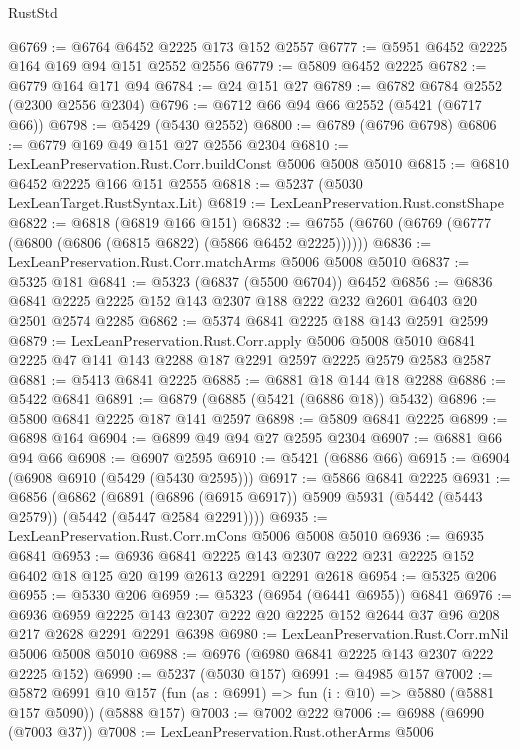\begin{lexlean}{RustStd}
\begin{coremodule}
@6769 := @6764 @6452 @2225 @173 @152 @2557
@6777 := @5951 @6452 @2225 @164 @169 @94 @151 @2552 @2556
@6779 := @5809 @6452 @2225
@6782 := @6779 @164 @171 @94
@6784 := @24 @151 @27
@6789 := @6782 @6784 @2552 (@2300 @2556 @2304)
@6796 := @6712 @66 @94 @66 @2552 (@5421 (@6717 @66))
@6798 := @5429 (@5430 @2552)
@6800 := @6789 (@6796 @6798)
@6806 := @6779 @169 @49 @151 @27 @2556 @2304
@6810 := LexLeanPreservation.Rust.Corr.buildConst @5006 @5008 @5010
@6815 := @6810 @6452 @2225 @166 @151 @2555
@6818 := @5237 (@5030 LexLeanTarget.RustSyntax.Lit)
@6819 := LexLeanPreservation.Rust.constShape
@6822 := @6818 (@6819 @166 @151)
@6832 := @6755 (@6760 (@6769 (@6777 (@6800 (@6806 (@6815 @6822) (@5866 @6452 @2225))))))
@6836 := LexLeanPreservation.Rust.Corr.matchArms @5006 @5008 @5010
@6837 := @5325 @181
@6841 := @5323 (@6837 (@5500 @6704)) @6452
@6856 := @6836 @6841 @2225 @2225 @152 @143 @2307 @188 @222 @232 @2601 @6403 @20 @2501 @2574 @2285
@6862 := @5374 @6841 @2225 @188 @143 @2591 @2599
@6879 := LexLeanPreservation.Rust.Corr.apply
    @5006
    @5008
    @5010
    @6841
    @2225
    @47
    @141
    @143
    @2288
    @187
    @2291
    @2597
    @2225
    @2579
    @2583
    @2587
@6881 := @5413 @6841 @2225
@6885 := @6881 @18 @144 @18 @2288
@6886 := @5422 @6841
@6891 := @6879 (@6885 (@5421 (@6886 @18)) @5432)
@6896 := @5800 @6841 @2225 @187 @141 @2597
@6898 := @5809 @6841 @2225
@6899 := @6898 @164
@6904 := @6899 @49 @94 @27 @2595 @2304
@6907 := @6881 @66 @94 @66
@6908 := @6907 @2595
@6910 := @5421 (@6886 @66)
@6915 := @6904 (@6908 @6910 (@5429 (@5430 @2595)))
@6917 := @5866 @6841 @2225
@6931 := @6856
    (@6862
      (@6891 (@6896 (@6915 @6917)) @5909 @5931 (@5442 (@5443 @2579)) (@5442 (@5447 @2584 @2291))))
@6935 := LexLeanPreservation.Rust.Corr.mCons @5006 @5008 @5010
@6936 := @6935 @6841
@6953 := @6936
    @6841
    @2225
    @143
    @2307
    @222
    @231
    @2225
    @152
    @6402
    @18
    @125
    @20
    @199
    @2613
    @2291
    @2291
    @2618
@6954 := @5325 @206
@6955 := @5330 @206
@6959 := @5323 (@6954 (@6441 @6955)) @6841
@6976 := @6936
    @6959
    @2225
    @143
    @2307
    @222
    @20
    @2225
    @152
    @2644
    @37
    @96
    @208
    @217
    @2628
    @2291
    @2291
    @6398
@6980 := LexLeanPreservation.Rust.Corr.mNil @5006 @5008 @5010
@6988 := @6976 (@6980 @6841 @2225 @143 @2307 @222 @2225 @152)
@6990 := @5237 (@5030 @157)
@6991 := @4985 @157
@7002 := @5872
    @6991
    @10
    @157
    (fun (as : @6991) => fun (i : @10) => @5880 (@5881 @157 @5090))
    (@5888 @157)
@7003 := @7002 @222
@7006 := @6988 (@6990 (@7003 @37))
@7008 := LexLeanPreservation.Rust.otherArms @5006

\end{coremodule}
\end{lexlean}
